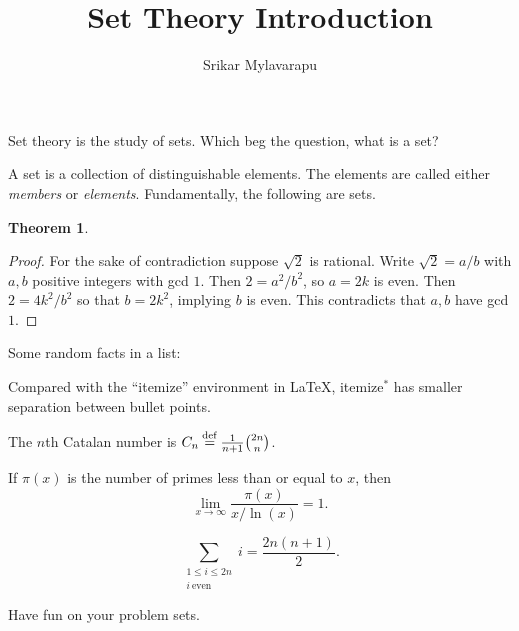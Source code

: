 \documentclass[12pt]{article}
\author{Srikar Mylavarapu}
\title{Set Theory Introduction}
\newenvironment{itemize*}%
  {\vspace{-2ex} \begin{itemize} %
     \setlength{\itemsep}{-1ex} \setlength{\parsep}{0pt}}%
  {\end{itemize}}
\newcommand{\eqdef}{\mathbin{\stackrel{\rm def}{=}}}
\newtheorem{theorem}{Theorem}
\begin{document}
\maketitle

Set theory is the study of sets. Which beg the question, what is a set?

A set is a collection of distinguishable elements. The elements are called either \emph{members} or \emph{elements}. Fundamentally, the following are sets.

\begin{theorem}

\end{theorem}


\begin{proof}
For the sake of contradiction suppose $\sqrt{2}$ is rational. Write $\sqrt{2} = a/b$ with $a,b$ positive integers with gcd $1$. Then $2 = a^2/b^2$, so $a = 2k$ is even. Then $2 = 4k^2/b^2$ so that $b = 2k^2$, implying $b$ is even. This contradicts that $a,b$ have gcd $1$.
\end{proof}

Some random facts in a list:

\begin{itemize*}
\item Compared with the ``itemize'' environment in \LaTeX, itemize$^*$ has smaller separation between bullet points.
\item The $n$th Catalan number is $C_n \eqdef \frac{1}{n+1} \binom{2n}{n}$.
\item If $\pi(x)$ is the number of primes less than or equal to $x$, then
$$\lim_{x\rightarrow\infty} \frac{\pi(x)}{x/\ln(x)} = 1 . $$
\item $$ \sum_{\substack{1\le i\le 2n\\i\ \mathrm{even}}} i = \frac{2n(n+1)}2 .$$
\end{itemize*}

Have fun on your problem sets.
\end{document}
